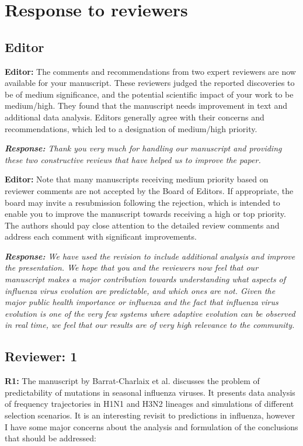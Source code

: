 \documentclass[aps,rmp,onecolumn]{revtex4-1}
\newcommand{\refa}[1]{\textbf{R1:} #1\vskip 5mm}
\newcommand{\editor}[1]{\textbf{Editor:} #1\vskip 5mm}
\newcommand{\response}[1]{{\it {\color{response}\textbf{Response:} #1}}\vskip 5mm}
\begin{document}
\section*{Response to reviewers}

\subsection*{Editor}


\editor{The comments and recommendations from two expert reviewers are now available for your manuscript. These reviewers judged the reported discoveries to be of medium significance, and the potential scientific impact of your work to be medium/high. They found that the manuscript needs improvement in text and additional data analysis. Editors generally agree with their concerns and recommendations, which led to a designation of medium/high priority. }

\response{
Thank you very much for handling our manuscript and providing these two constructive reviews that have helped us to improve the paper.
}


\editor{Note that many manuscripts receiving medium priority based on reviewer comments are not accepted by the Board of Editors. If appropriate, the board may invite a resubmission following the rejection, which is intended to enable you to improve the manuscript towards receiving a high or top priority. The authors should pay close attention to the detailed review comments and address each comment with significant improvements.}

\response{We have used the revision to include additional analysis and improve the presentation. We hope that you and the reviewers now feel that our manuscript makes a major contribution towards understanding what aspects of influenza virus evolution are predictable, and which ones are not. Given the major public health importance or influenza and the fact that influenza virus evolution is one of the very few systems where adaptive evolution can be observed in real time, we feel that our results are of very high relevance to the community.
}


\subsection*{Reviewer: 1}

\refa{The manuscript by Barrat-Charlaix et al. discusses the problem of
predictability of mutations in seasonal influenza viruses. It presents
data analysis of frequency trajectories in H1N1 and H3N2 lineages and
simulations of different selection scenarios.
It is an interesting revisit to predictions in influenza, however I
have some major concerns about the analysis and formulation of the
conclusions that should be addressed:}
\end{document}
